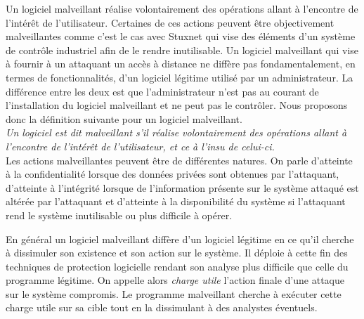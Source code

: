 Un logiciel malveillant réalise volontairement des opérations allant à l'encontre de l'intérêt de l'utilisateur. 
Certaines de ces actions peuvent être objectivement malveillantes comme c'est le cas avec Stuxnet qui vise des éléments d'un système de contrôle industriel afin de le rendre inutilisable. 
Un logiciel malveillant qui vise à fournir à un attaquant un accès à distance ne diffère pas fondamentalement, en termes de fonctionnalités, d'un logiciel légitime utilisé par un administrateur.
La différence entre les deux est que l'administrateur n'est pas au courant de l'installation du logiciel malveillant et ne peut pas le contrôler.
Nous proposons donc la définition suivante pour un logiciel malveillant.
\\

\textit{Un logiciel est dit malveillant s'il réalise volontairement des opérations allant à l'encontre de l'intérêt de l'utilisateur, et ce à l'insu de celui-ci.}
\\ 

Les actions malveillantes peuvent être de différentes natures. On parle d'atteinte à la confidentialité lorsque des données privées sont obtenues par l'attaquant, d'atteinte à l'intégrité lorsque de l'information présente sur le système attaqué est altérée par l'attaquant et d'atteinte à la disponibilité du système si l'attaquant rend le système inutilisable ou plus difficile à opérer.


En général un logiciel malveillant diffère d'un logiciel légitime en ce qu'il cherche à dissimuler son existence et son action sur le système. Il déploie à cette fin des techniques de protection logicielle rendant son analyse plus difficile que celle du programme légitime.
On appelle alors \emph{charge utile} l'action finale d'une attaque sur le système compromis.
Le programme malveillant cherche à exécuter cette charge utile sur sa cible tout en la dissimulant à des analystes éventuels.


